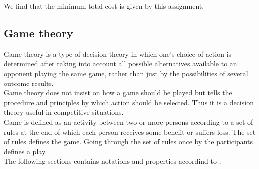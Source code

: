 We find that the minimum total cost is given by this assignment.

\subsection{Game theory}
Game theory is a type of decision theory in which one’s choice of action is determined after taking
into account all possible alternatives available to an opponent playing the same game, rather than just
by the possibilities of several outcome results. \\
Game theory does not insist on how a game should be played but tells the procedure and principles by which action should be selected.
Thus it is a decision theory useful in competitive situations. \\
Game is defined as an activity between two or more persons according to a set of rules at the end of
which each person receives some benefit or suffers loss. The set of rules defines the game.
Going through the set of rules once by the participants defines a play.
\\

The following sections contains notations and properties accordind to \cite{game_theory:2020}.

